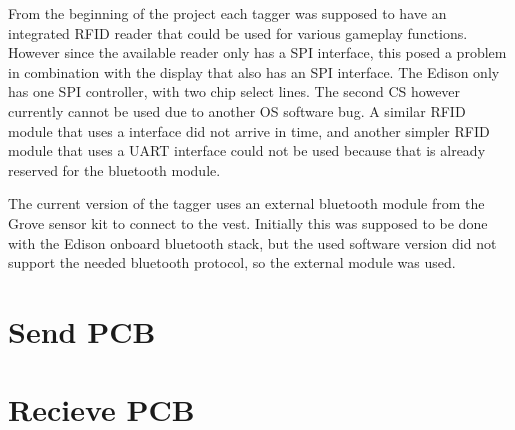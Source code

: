 From the beginning of the project each tagger was supposed to have an integrated RFID reader that could be used for various gameplay functions. However since the available reader only has a SPI interface, this posed a problem in combination with the display that also has an SPI interface. The Edison only has one SPI controller, with two chip select lines. The second CS however currently cannot be used due to another OS software bug. A similar RFID module that uses a \isqc interface did not arrive in time, and another simpler RFID module that uses a UART interface could not be used because that is already reserved for the bluetooth module.

The current version of the tagger uses an external bluetooth module from the Grove sensor kit  to connect to the vest. Initially this was supposed to be done with the Edison onboard bluetooth stack, but the used software version did not support the needed bluetooth protocol, so the external module was used.



\section{Send PCB}

\section{Recieve PCB}





















